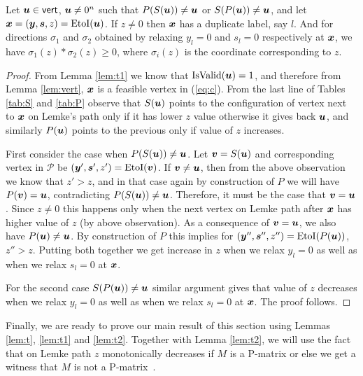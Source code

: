 \documentclass[a4paper,UKenglish]{lipics2}
\theoremstyle{definition}
\def\eti{\mbox{EtoI}}
\def\isvalid{\mbox{IsValid}}
\def\vert{\operatorname{\mathsf{vert}}}
\newcommand{\CPol}{\mbox{${\mathcal P}$}}
\newcommand{\yy}{\mbox{\boldmath $y$}}
\newcommand{\uu}{\mbox{\boldmath $u$}}
\newcommand{\vv}{\mbox{\boldmath $v$}}
\newcommand{\xx}{\mbox{\boldmath $x$}}
\newcommand{\ps}{\mbox{\boldmath $s$}}
\begin{document}
\begin{lemma}\label{lem:t2}
Let $\uu \in \vert$, $\uu \neq 0^n$ such that $P(S(\uu))\neq \uu$ or $S(P(\uu))\neq \uu$, and let $\xx=(\yy,\ps,z)=\eti(\uu)$. 
If $z\neq 0$ then $\xx$ has a duplicate label, say $l$. And for directions $\sigma_1$ and $\sigma_2$ obtained by relaxing $y_l=0$ and $s_l=0$ respectively at $\xx$, we have $\sigma_1(z)*\sigma_2(z)\ge 0$, where $\sigma_i(z)$ is the coordinate corresponding to $z$. 
\end{lemma}
\begin{proof}
From Lemma \ref{lem:t1} we know that $\isvalid(\uu)=1$, and therefore from Lemma \ref{lem:vert}, $\xx$ is a feasible vertex in (\ref{eq:c}).
From the last line of Tables \ref{tab:S} and \ref{tab:P} observe that $S(\uu)$ points to the configuration of vertex next to $\xx$ on Lemke's path only if it has lower $z$ value otherwise it gives back $\uu$, and similarly $P(\uu)$ points to the previous only if value of $z$ increases.


First consider the case when $P(S(\uu))\neq \uu$. Let $\vv=S(\uu)$ and corresponding vertex in $\CPol$ be $(\yy',\ps',z')=\eti(\vv)$. 
If $\vv\neq \uu$, then from the above observation we know that $z'>z$, and in that
case again by construction of $P$ we will have $P(\vv)=\uu$, contradicting
$P(S(\uu))\neq \uu$. Therefore, it must be the case that $\vv=\uu$.
Since $z\neq 0$ this happens only when the next vertex on Lemke path after $\xx$ has
higher value of $z$ (by above observation). As a consequence of $\vv=\uu$, we also have $P(\uu)\neq \uu$. By construction of $P$ this implies for 
$(\yy'',\ps'',z'')=\eti(P(\uu))$, $z''>z$. Putting both together we get 
increase in $z$ when we relax $y_l=0$ as well as when we relax $s_l=0$ at
$\xx$.

For the second case $S(P(\uu))\neq \uu$ similar argument gives that value of $z$ decreases when we relax $y_l=0$ as well as when we relax $s_l=0$ at
$\xx$. The proof follows.
\end{proof}

Finally, we are ready to prove our main result of this section using Lemmas
\ref{lem:t}, \ref{lem:t1} and \ref{lem:t2}. Together with Lemma \ref{lem:t2},
we will use the fact that on Lemke path $z$ monotonically decreases if $M$ is a
P-matrix or else we get a witness that $M$ is not a
P-matrix~\cite{cottle2009linear}. 
\end{document}
